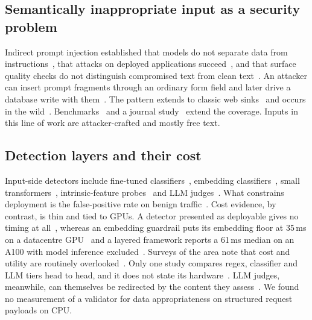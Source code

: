 \documentclass[conference]{IEEEtran}
\begin{document}
\subsection{Semantically inappropriate input as a security problem}
Indirect prompt injection established that models do not separate data from
instructions~\cite{greshake2023indirect}, that attacks on deployed applications
succeed~\cite{liu2023houyi,kaya2026chatbotplugins}, and that surface quality checks do not distinguish
compromised text from clean text~\cite{liu2024formalizing}. An attacker can insert prompt fragments
through an ordinary form field and later drive a database write with them~\cite{pedro2025p2sql}. The
pattern extends to classic web sinks~\cite{tsigkopoulos2026webexploitation} and occurs in the
wild~\cite{khodayari2026ipiwild}. Benchmarks~\cite{yi2025bipia,evtimov2025wasp,liu2025wainjectbench}
and a journal study~\cite{milani2026ipi} extend the coverage. Inputs in this line of work are
attacker-crafted and mostly free text.

\subsection{Detection layers and their cost}
Input-side detectors include fine-tuned classifiers~\cite{jacob2025promptshield,liu2025datasentinel},
embedding classifiers~\cite{ayub2024embedding,ahmed2026reflexguard}, small
transformers~\cite{datta2025javelinguard,lakara2026fence}, intrinsic-feature
probes~\cite{shi2025promptarmor,akinrele2026regime} and LLM
judges~\cite{le2026llmjudge,rebedea2023nemo}. What constrains deployment is the false-positive rate on benign
traffic~\cite{li2024injecguard}. Cost evidence, by contrast, is thin and tied to GPUs. A detector
presented as deployable gives no timing at all~\cite{jacob2025promptshield}, whereas an embedding
guardrail puts its embedding floor at 35\,ms on a datacentre GPU~\cite{ahmed2026reflexguard} and a
layered framework reports a 61\,ms median on an A100 with model inference
excluded~\cite{saleem2026layered}. Surveys of the area note that cost and utility are routinely
overlooked~\cite{wang2026sokguardrails,zizzo2025guardrails,kumar2025nofreelunch}. Only one study
compares regex, classifier and LLM tiers head to head, and it does not state its
hardware~\cite{maiorano2026tradeoffs}. LLM judges, meanwhile, can themselves be
redirected by the content they assess~\cite{shi2024judgeattack}. We found no measurement of a validator for data appropriateness
on structured request payloads on CPU.
\end{document}

